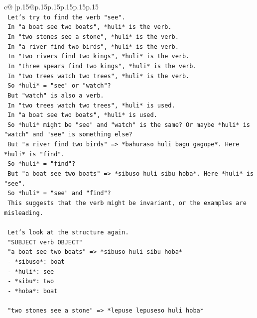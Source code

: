 \documentclass{article}
\begin{document}
{\begin{supertabular}{c@{$\;$}|p{.15\linewidth}@{}p{.15\linewidth}p{.15\linewidth}p{.15\linewidth}p{.15\linewidth}p{.15\linewidth}}
{{{\\ 
\texttt{   Let's try to find the verb "see".} \\
\texttt{   In "a boat see two boats", *huli* is the verb.} \\
\texttt{   In "two stones see a stone", *huli* is the verb.} \\
\texttt{   In "a river find two birds", *huli* is the verb.} \\
\texttt{   In "two rivers find two kings", *huli* is the verb.} \\
\texttt{   In "three spears find two kings", *huli* is the verb.} \\
\texttt{   In "two trees watch two trees", *huli* is the verb.} \\
\texttt{   So *huli* = "see" or "watch"?} \\
\texttt{   But "watch" is also a verb.} \\
\texttt{   In "two trees watch two trees", *huli* is used.} \\
\texttt{   In "a boat see two boats", *huli* is used.} \\
\texttt{   So *huli* might be "see" and "watch" is the same? Or maybe *huli* is "watch" and "see" is something else?} \\
\texttt{   But "a river find two birds" => *bahuraso huli bagu gagope*. Here *huli* is "find".} \\
\texttt{   So *huli* = "find"?} \\
\texttt{   But "a boat see two boats" => *sibuso huli sibu hoba*. Here *huli* is "see".} \\
\texttt{   So *huli* = "see" and "find"?} \\
\texttt{   This suggests that the verb might be invariant, or the examples are misleading.} \\
\\ 
\texttt{   Let's look at the structure again.} \\
\texttt{   "SUBJECT verb OBJECT"} \\
\texttt{   "a boat see two boats" => *sibuso huli sibu hoba*} \\
\texttt{   {-} *sibuso*: boat} \\
\texttt{   {-} *huli*: see} \\
\texttt{   {-} *sibu*: two} \\
\texttt{   {-} *hoba*: boat} \\
\\ 
\texttt{   "two stones see a stone" => *lepuse lepuseso huli hoba*} \\
}}}
\end{supertabular}}
\end{document}
